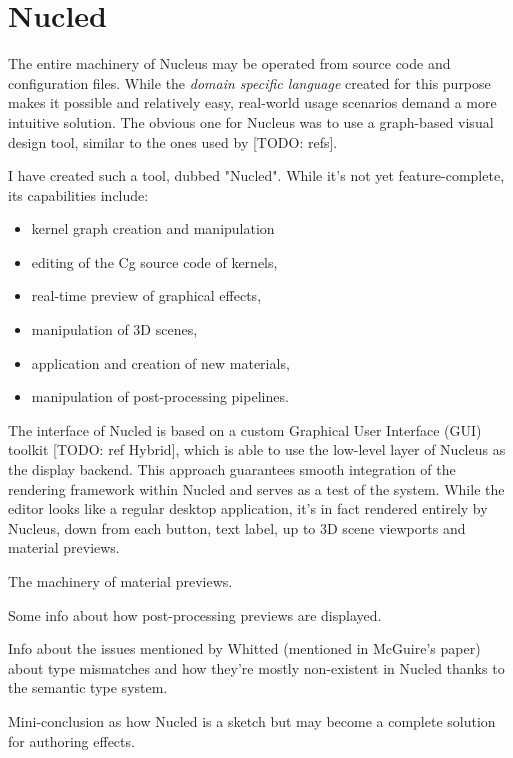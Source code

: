 
\chapter{ Nucled }
\label{Chapter5}

The entire machinery of Nucleus may be operated from source code and configuration files. While the \emph{ domain specific language } created for this purpose makes it possible and relatively easy, real-world usage scenarios demand a more intuitive solution. The obvious one for Nucleus was to use a graph-based visual design tool, similar to the ones used by [TODO: refs].

I have created such a tool, dubbed "Nucled". While it's not yet feature-complete, its capabilities include:

\begin{itemize}
\item kernel graph creation and manipulation
\item editing of the Cg source code of kernels,
\item real-time preview of graphical effects,
\item manipulation of 3D scenes,
\item application and creation of new materials,
\item manipulation of post-processing pipelines.
\end{itemize}

The interface of Nucled is based on a custom Graphical User Interface (GUI) toolkit [TODO: ref Hybrid], which is able to use the low-level layer of Nucleus as the display backend. This approach guarantees smooth integration of the rendering framework within Nucled and serves as a test of the system. While the editor looks like a regular desktop application, it's in fact rendered entirely by Nucleus, down from each button, text label, up to 3D scene viewports and material previews.

The machinery of material previews.

Some info about how post-processing previews are displayed.

Info about the issues mentioned by Whitted (mentioned in McGuire's paper) about type mismatches and how they're mostly non-existent in Nucled thanks to the semantic type system.

Mini-conclusion as how Nucled is a sketch but may become a complete solution for authoring effects.
